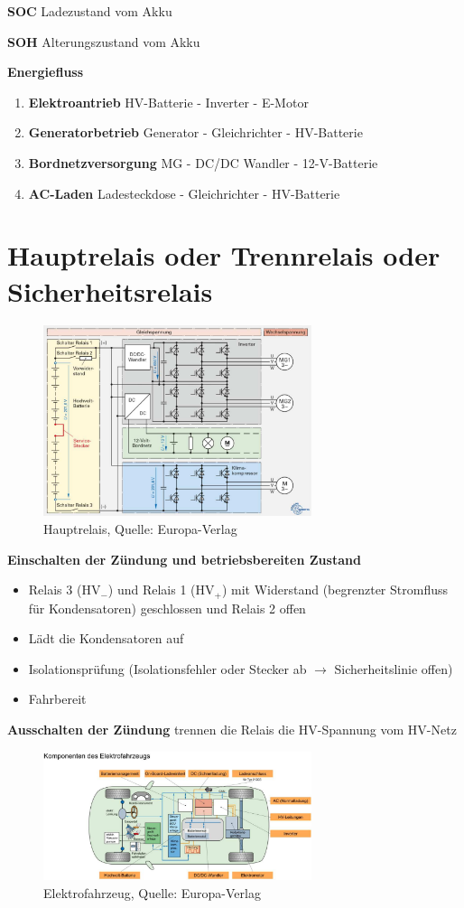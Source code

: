 \textbf{SOC} Ladezustand vom Akku

\textbf{SOH} Alterungszustand vom Akku

\textbf{Energiefluss}

\begin{enumerate}
\item
  \textbf{Elektroantrieb} HV-Batterie - Inverter - E-Motor
\item
  \textbf{Generatorbetrieb} Generator - Gleichrichter - HV-Batterie
\item
  \textbf{Bordnetzversorgung} MG - DC/DC Wandler - 12-V-Batterie
\item
  \textbf{AC-Laden} Ladesteckdose - Gleichrichter - HV-Batterie
\end{enumerate}

\newpage

\section{Hauptrelais oder Trennrelais oder
Sicherheitsrelais}\label{hauptrelais-oder-trennrelais-oder-sicherheitsrelais}

\begin{figure}[!ht]%
\centering
\includegraphics[width=0.7\textwidth]{images/HV/HV-2.pdf}
\caption{Hauptrelais, Quelle: Europa-Verlag}
\end{figure}

\textbf{Einschalten der Zündung und betriebsbereiten Zustand}

\begin{itemize}
\item
  Relais 3 ($\text{HV}_-$) und Relais 1 ($\text{HV}_+$) mit
  Widerstand (begrenzter Stromfluss für Kondensatoren) geschlossen und
  Relais 2 offen
\item
  Lädt die Kondensatoren auf
\item
  Isolationsprüfung (Isolationsfehler oder Stecker ab $\to$
  Sicherheitslinie offen)
\item
  Fahrbereit
\end{itemize}

\textbf{Ausschalten der Zündung} trennen die Relais die HV-Spannung vom
HV-Netz

\begin{figure}[!ht]%
\centering
\includegraphics[width=0.7\textwidth]{images/HV/HV-4.pdf}
\caption{Elektrofahrzeug, Quelle: Europa-Verlag}
\end{figure}
